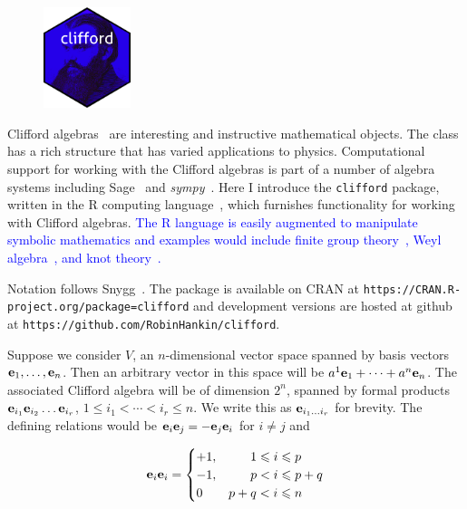 \documentclass{birkjour}
\theoremstyle{definition}
\theoremstyle{remark}
\numberwithin{equation}{section}
\begin{document}
\setlength{\intextsep}{0pt}
\begin{figure}
  \begin{center}
\includegraphics[width=1in]{clifford.png}
  \end{center}
\end{figure}
Clifford algebras~\cite{hestenes1987} are interesting and instructive
mathematical objects.  The class has a rich structure that has varied
applications to physics.  Computational support for working with the
Clifford algebras is part of a number of algebra systems including
Sage~\cite{sagemath2019} and \textit{sympy}~\cite{sympy2017}.  Here I
introduce the {\tt clifford} package, written in the R computing
language~\cite{rcore2022}, which furnishes functionality for working
with Clifford algebras.  \textcolor{blue}{The R language is easily
  augmented to manipulate symbolic mathematics and examples would
  include finite group theory~\cite{hankin2020_permutations}, Weyl
  algebra~\cite{hankin2022_weyl_arxiv}, and knot
  theory~\cite{hankin2023}.}

Notation follows Snygg~\cite{snygg2010}.  The
package is available on CRAN at
\verb+https://CRAN.R-project.org/package=clifford+ and development
versions are hosted at github at
\verb+https://github.com/RobinHankin/clifford+.


\newcommand{\ei}[1]{\ensuremath{{\bf e}_{#1}}}


Suppose we consider $V$, an $n$-dimensional vector space spanned by basis vectors
$\ei{1},\ldots,\ei{n}$.  Then an arbitrary vector in this space will
be $a^1\ei{1}+\cdots+a^n\ei{n}$.  The associated Clifford algebra will
be of dimension $2^n$, spanned by formal products
$\ei{i_1}\ei{i_2}\ldots\ei{i_r}$, $1\leqslant i_1<\cdots<i_r\leqslant
n$.  We write this as $\ei{i_1\ldots i_r}$ for brevity.  The defining
relations would be $\ei{i}\ei{j}=-\ei{j}\ei{i}$ for $i\neq j$ and

\textcolor{blue}{
\begin{equation}\label{posdefcliff2}
\ei{i}\ei{i} = \begin{cases}
    +1, & \hphantom{p+{}}1\leqslant i\leqslant p\\
    -1, & \hphantom{p+{}}p < i\leqslant p+q\\
    0   & p+q < i\leqslant n
  \end{cases}
\end{equation}
}
\end{document}
